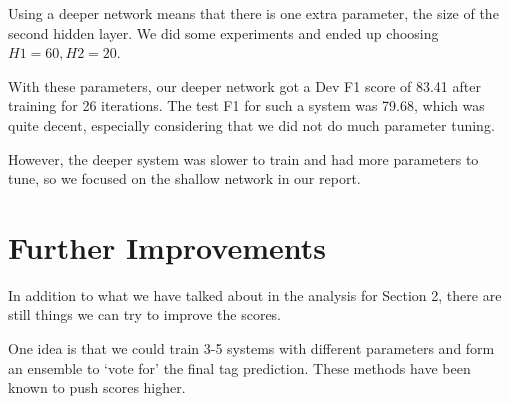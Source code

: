 \documentclass[12pt, twocolumn]{article}
\begin{document}
Using a deeper network means that there is one extra parameter, the size of the second hidden layer. We did some experiments and ended up choosing $H1=60,H2=20$.

With these parameters, our deeper network got a Dev F1 score of 83.41 after training for 26 iterations. The test F1 for such a system was 79.68, which was quite decent, especially considering that we did not do much parameter tuning.

However, the deeper system was slower to train and had more parameters to tune, so we focused on the shallow network in our report.
\section{Further Improvements}
In addition to what we have talked about in the analysis for Section 2, there are still things we can try to improve the scores.

One idea is that we could train 3-5 systems with different parameters and form an ensemble to `vote for' the final tag prediction. These methods have been known to push scores higher.
\end{document}
